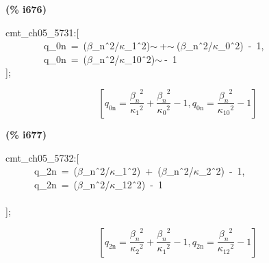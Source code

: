 \documentclass[fleqn]{article}
\begin{document}
\noindent
\begin{minipage}[t]{4.000000em}\color{red}\bfseries
(\% i676)	
\end{minipage}
\begin{minipage}[t]{\textwidth}\color{blue}
cmt\_ch05\_5731:[\\
\ \ \ \ \ \ \ \ q\_0n\ =\ (\ensuremath{\beta}\_n\^\ 2/\ensuremath{\kappa}\_1\^\ 2)\ensuremath{\sim\ }+\ensuremath{\sim\ }(\ensuremath{\beta}\_n\^\ 2/\ensuremath{\kappa}\_0\^\ 2)\ -\ 1,\\
\ \ \ \ \ \ \ \ q\_0n\ =\ (\ensuremath{\beta}\_n\^\ 2/\ensuremath{\kappa}\_10\^\ 2)\ensuremath{\sim\ }-\ 1\\
];
\end{minipage}
\[\displaystyle \tag{\% o676} 
\left[ {q_{\ensuremath{\mathrm{0n}}}}=\frac{{{{{\beta }_n}}^{2}}}{{{{{\kappa }_1}}^{2}}}+\frac{{{{{\beta }_n}}^{2}}}{{{{{\kappa }_0}}^{2}}}-1\operatorname{,}{q_{\ensuremath{\mathrm{0n}}}}=\frac{{{{{\beta }_n}}^{2}}}{{{{{\kappa }_{\ensuremath{\mathrm{10}}}}}^{2}}}-1\right] \mbox{}
\]


\noindent
\begin{minipage}[t]{4.000000em}\color{red}\bfseries
(\% i677)	
\end{minipage}
\begin{minipage}[t]{\textwidth}\color{blue}
cmt\_ch05\_5732:[\\
\ \ \ \ \ \ q\_2n\ =\ (\ensuremath{\beta}\_n\^\ 2/\ensuremath{\kappa}\_1\^\ 2)\ +\ (\ensuremath{\beta}\_n\^\ 2/\ensuremath{\kappa}\_2\^\ 2)\ -\ 1,\\
\ \ \ \ \ \ q\_2n\ =\ (\ensuremath{\beta}\_n\^\ 2/\ensuremath{\kappa}\_12\^\ 2)\ -\ 1\\
\ \ \ \\
];
\end{minipage}
\[\displaystyle \tag{\% o677} 
\left[ {q_{\ensuremath{\mathrm{2n}}}}=\frac{{{{{\beta }_n}}^{2}}}{{{{{\kappa }_2}}^{2}}}+\frac{{{{{\beta }_n}}^{2}}}{{{{{\kappa }_1}}^{2}}}-1\operatorname{,}{q_{\ensuremath{\mathrm{2n}}}}=\frac{{{{{\beta }_n}}^{2}}}{{{{{\kappa }_{\ensuremath{\mathrm{12}}}}}^{2}}}-1\right] \mbox{}
\]
\end{document}
